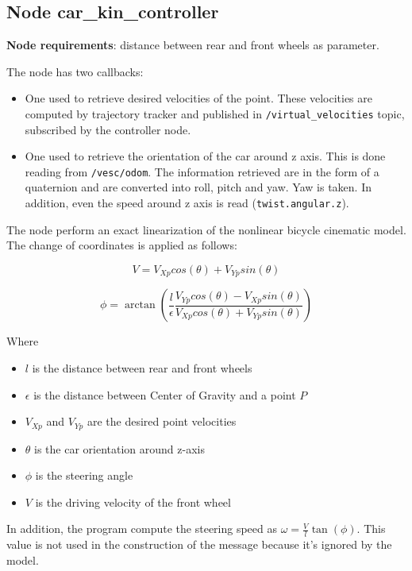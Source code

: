 \documentclass[12pt, letterpaper]{report}
\begin{document}
\subsection{Node car\_kin\_controller}

\textbf{Node requirements}: distance between rear and front wheels as parameter.

The node has two callbacks:

\begin{itemize}
	\item One used to retrieve desired velocities of the point. These velocities are computed by trajectory tracker and published in \verb|/virtual_velocities| topic, subscribed by the controller node.
	\item One used to retrieve the orientation of the car around z axis. This is done reading from \verb|/vesc/odom|. The information retrieved are in the form of a quaternion and are converted into roll, pitch and yaw. Yaw is taken. In addition, even the speed around z axis is read (\verb|twist.angular.z|).
\end{itemize}

The node perform an exact linearization of the nonlinear bicycle cinematic model. The change of coordinates is applied as follows:

\[
V = V_{Xp}cos(\theta) + V_{Yp}sin(\theta)
\]

\[
\phi = \arctan\left(\frac{l}{\epsilon} \frac{ V_{Yp}cos(\theta) - V_{Xp}sin(\theta) }{ V_{Xp}cos(\theta) + V_{Yp}sin(\theta) }\right)
\]

Where 

\begin{itemize}
	\item $l$ is the distance between rear and front wheels
	\item $\epsilon$ is the distance between Center of Gravity and a point $P$
	\item $V_{Xp}$ and $V_{Yp}$ are the desired point velocities
	\item $\theta$ is the car orientation around z-axis
	\item $\phi$ is the steering angle
	\item $V$ is the driving velocity of the front wheel
\end{itemize}

In addition, the program compute the steering speed as $\omega = \frac{V}{l}\tan(\phi)$. This value is not used in the construction of the message because it's ignored by the model.
\end{document}
